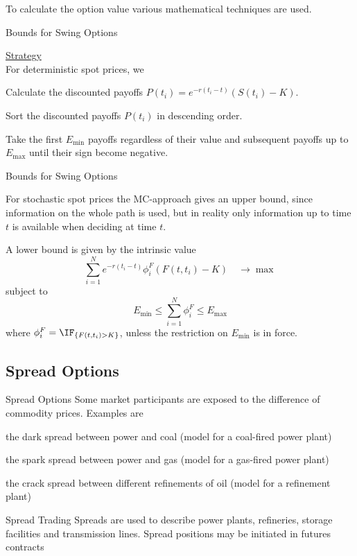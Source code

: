 To calculate the option value various mathematical techniques are used.

{Bounds for Swing Options}

\underline{Strategy}\\
For deterministic spot prices, we






	Calculate the discounted payoffs
  $P(t_i)=e^{-r(t_i-t)}(S(t_i)-K)$.


	Sort the discounted payoffs $P(t_i)$ in descending order.


	Take the first $E_{\min}$ payoffs regardless of their
  value and subsequent payoffs up to $E_{\max}$ until their sign
  become negative.





{Bounds for Swing Options}

For stochastic spot prices the MC-approach gives an upper bound,
since information on the whole path is used, but in reality only
information up to time $t$ is available when deciding at time $t$.

A lower bound is given by the intrinsic value
$$\sum_{i=1}^Ne^{-r(t_i-t)} \phi_i^F (F(t,t_i)-K) \quad\rightarrow\max$$
subject to $$E_{\min}\leq\sum_{i=1}^N\phi^F_i\leq E_{\max}$$
where $\phi_i^F=\IF_{\{F(t,t_i)>K\}}$, unless the restriction on $E_{\min}$ is in force.

\subsection{Spread Options}

{Spread Options}
Some market participants are exposed to the difference of
commodity prices. Examples are






	the dark spread between power and coal (model for a coal-fired power plant)


	the spark spread between power and gas (model for a gas-fired power plant)


	the crack spread between different refinements of oil (model for a refinement plant)





{Spread Trading}
Spreads are used to describe power plants, refineries, storage facilities and transmission lines. Spread positions may be initiated in futures contracts


